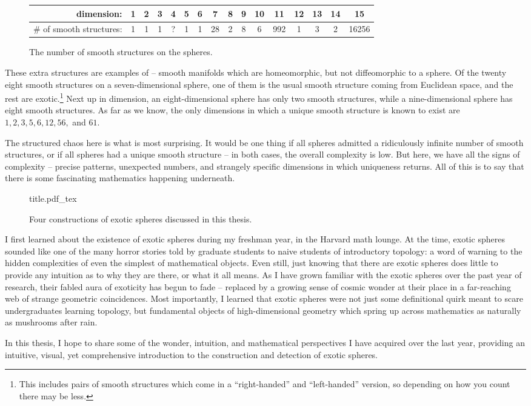 \begin{figure}[ht]
	\renewcommand{\arraystretch}{1.2}
	\centering
	\begin{tabular}{r|c|c|c|c|c|c|c|c|c|c|c|c|c|c|c}
		\textrm{dimension:}               & 1 & 2 & 3 & 4 & 5 & 6 & 7  & 8 & 9 & 10 & 11  & 12 & 13 & 14 & 15    \\
		\hline
		\textrm{\# of smooth structures:} & 1 & 1 & 1 & ? & 1 & 1 & 28 & 2 & 8 & 6  & 992 & 1  & 3  & 2  & 16256 \\
	\end{tabular}
	\caption{The number of smooth structures on the spheres.}
\end{figure}

These extra structures are examples of  -- smooth manifolds which are homeomorphic, but not diffeomorphic to a sphere.
Of the twenty eight smooth structures on a seven-dimensional sphere, one of them is the usual smooth structure coming from Euclidean space, and the rest are exotic.\footnote{This includes pairs of smooth structures which come in a ``right-handed'' and ``left-handed'' version, so depending on how you count there may be less.} 
Next up in dimension, an eight-dimensional sphere has only two smooth structures, while a nine-dimensional sphere has eight smooth structures. 
As far as we know, the only dimensions in which a unique smooth structure is known to exist are $1,2,3,5,6,12,56,$ and $61$.

The structured chaos here is what is most surprising. 
It would be one thing if all spheres admitted a ridiculously infinite number of smooth structures, or if all spheres had a unique smooth structure -- in both cases, the overall complexity is low. 
But here, we have all the signs of complexity -- precise patterns, unexpected numbers, and strangely specific dimensions in which uniqueness returns. All of this is to say that there is some fascinating mathematics happening underneath.

\begin{figure}[ht]
	\centering
	{title.pdf_tex}
	\caption{Four constructions of exotic spheres discussed in this thesis.}
\end{figure}

\smallrule

I first learned about the existence of exotic spheres during my freshman year, in the Harvard math lounge. At the time, exotic spheres sounded like one of the many horror stories told by graduate students to naive students of introductory topology: a word of warning to the hidden complexities of even the simplest of mathematical objects. 
Even still, just knowing that there are exotic spheres does little to provide any intuition as to why they are there, or what it all means. 
As I have grown familiar with the exotic spheres over the past year of research, their fabled aura of exoticity has begun to fade -- replaced by a growing sense of cosmic wonder at their place in a far-reaching web of strange geometric coincidences.
Most importantly, I learned that exotic spheres were not just some definitional quirk meant to scare undergraduates learning topology, 
but fundamental objects of high-dimensional geometry which spring up across mathematics as naturally as mushrooms after rain. 

In this thesis, I hope to share some of the wonder, intuition, and mathematical perspectives I have acquired over the last year, providing an intuitive, visual, yet comprehensive introduction to the construction and detection of exotic spheres.

